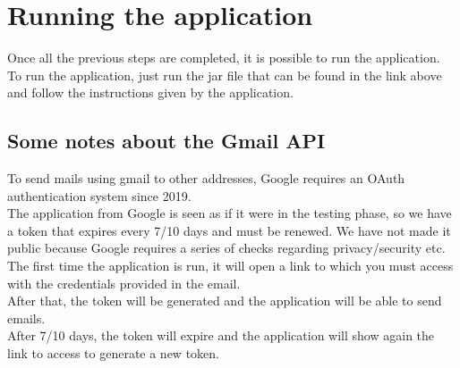\section{Running the application}
Once all the previous steps are completed, it is possible to run the application.\\
To run the application, just run the jar file that can be found in the link above and follow the instructions given by the application.

\subsection{Some notes about the Gmail API}

To send mails using gmail to other addresses, Google requires an OAuth authentication system since 2019.\\
The application from Google is seen as if it were in the testing phase, so we have a token that expires every 7/10 days and must be renewed. We have not made it public because Google requires a series of checks regarding privacy/security etc.\\

The first time the application is run, it will open a link to which you must access with the credentials provided in the email.\\
After that, the token will be generated and the application will be able to send emails.\\
After 7/10 days, the token will expire and the application will show again the link to access to generate a new token.\\
